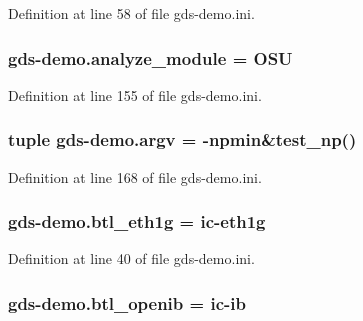 Definition at line 58 of file gds-\/demo.\-ini.

\hypertarget{namespacegds-demo_adedb86c1208d06a5408c0c8266f63670}{
\subsubsection[{analyze\-\_\-module}]{\setlength{\rightskip}{0pt plus 5cm}gds-\/demo.\-analyze\-\_\-module = O\-S\-U}}\label{namespacegds-demo_adedb86c1208d06a5408c0c8266f63670}


Definition at line 155 of file gds-\/demo.\-ini.

\hypertarget{namespacegds-demo_ac0172e0836a56b7aaec9bb9d5a697bcd}{
\subsubsection[{argv}]{\setlength{\rightskip}{0pt plus 5cm}tuple gds-\/demo.\-argv = -\/npmin\&test\-\_\-np()}}\label{namespacegds-demo_ac0172e0836a56b7aaec9bb9d5a697bcd}


Definition at line 168 of file gds-\/demo.\-ini.

\hypertarget{namespacegds-demo_a1a98caf64f4d8ec3980fda04116bb978}{
\subsubsection[{btl\-\_\-eth1g}]{\setlength{\rightskip}{0pt plus 5cm}gds-\/demo.\-btl\-\_\-eth1g = ic-\/eth1g}}\label{namespacegds-demo_a1a98caf64f4d8ec3980fda04116bb978}


Definition at line 40 of file gds-\/demo.\-ini.

\hypertarget{namespacegds-demo_aeadba89193ad7b62e80b8c3a321f46d2}{
\subsubsection[{btl\-\_\-openib}]{\setlength{\rightskip}{0pt plus 5cm}gds-\/demo.\-btl\-\_\-openib = ic-\/ib}}\label{namespacegds-demo_aeadba89193ad7b62e80b8c3a321f46d2}


